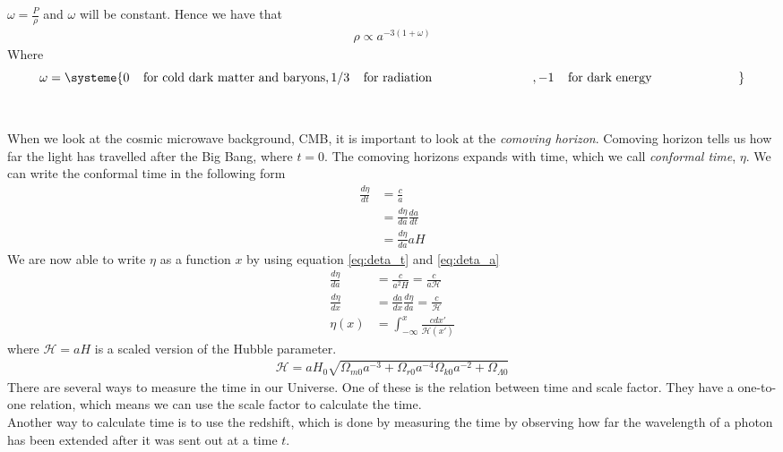 \documentclass{article}
\begin{document}
\begin{multicols}{2}
    $\omega=\frac{P}{\rho}$ and $\omega$ will be constant.
Hence we have that 
\begin{align}
    \rho\propto a^{-3(1+\omega)}
\end{align}
Where
\begin{equation}
\omega=
\systeme{
  0\;\;\;\; \text{for cold dark matter and baryons},
  1/3\;\;\;\; \text{for radiation} \;\;\;\;\;\;\;\;\;\;\;\;\;\;\;\;\;\;\;\;\;\;\;\;\;\;\;\;\;,
  -1\;\;\;\; \text{for dark energy}\;\;\;\;\;\;\;\;\;\;\;\;\;\;\;\;\;\;\;\;\;\;\;\;\;
} \label{eq:omega_val}
\end{equation}
\\
\\
When we look at the cosmic microwave background, CMB, it is important to look at the \emph{comoving horizon}. Comoving horizon tells us how far the light has travelled after the Big Bang, where $t=0$. The comoving horizons expands with time, which we call \emph{conformal time}, $\eta$. We can write the conformal time in the following form
\begin{align}
    \frac{d\eta}{dt}&=\frac{c}{a}\label{eq:deta_t}\\
    &=\frac{d\eta}{da}\frac{da}{dt}\\
    &=\frac{d\eta}{da}aH \label{eq:deta_a}
\end{align}
We are now able to write $\eta$ as a function $x$ by using equation \eqref{eq:deta_t} and \eqref{eq:deta_a}
\begin{align}
    \frac{d\eta}{da}&=\frac{c}{a^2H}=\frac{c}{a\mathcal{H}}\\
    \frac{d\eta}{dx}&=\frac{da}{dx}\frac{d\eta}{da}=\frac{c}{\mathcal{H}}\\
    \eta(x)&=\int_{-\infty}^x\frac{cdx'}{\mathcal{H}(x')} \label{eq:eta_x}
\end{align}
where $\mathcal{H}=aH$ is a scaled version of the Hubble parameter.
\begin{align}
    \mathcal{H}=aH_0\sqrt{\Omega_{m0}a^{-3}+\Omega_{r0}a^{-4}\Omega_{k0}a^{-2}+\Omega_{\Lambda0}} \label{eq:Friedmann_eq_Hp}
\end{align}
There are several ways to measure the time in our Universe. One of these is the relation between time and scale factor. They have a one-to-one relation, which means we can use the scale factor to calculate the time.\\
 Another way to calculate time is to use the redshift, which is done by measuring the time by observing how far the wavelength of a photon has been extended after it was sent out at a time $t$.

\end{multicols}
\end{document}
